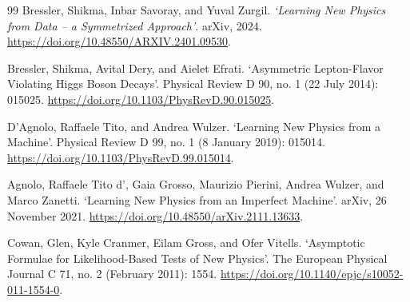
\begin{thebibliography}{99}
    Bressler, Shikma, Inbar Savoray, and Yuval Zurgil.
    \textit{‘Learning New Physics from Data -- a Symmetrized Approach’}. arXiv, 2024. \url{https://doi.org/10.48550/ARXIV.2401.09530}.

    Bressler, Shikma, Avital Dery, and Aielet Efrati. ‘Asymmetric Lepton-Flavor Violating Higgs Boson Decays’. Physical Review D 90, no. 1 (22 July 2014): 015025. \url{https://doi.org/10.1103/PhysRevD.90.015025}.

    D’Agnolo, Raffaele Tito, and Andrea Wulzer. ‘Learning New Physics from a Machine’. Physical Review D 99, no. 1 (8 January 2019): 015014. \url{https://doi.org/10.1103/PhysRevD.99.015014}.

    Agnolo, Raffaele Tito d’, Gaia Grosso, Maurizio Pierini, Andrea Wulzer, and Marco Zanetti. ‘Learning New Physics from an Imperfect Machine’. arXiv, 26 November 2021. \url{https://doi.org/10.48550/arXiv.2111.13633}.

    Cowan, Glen, Kyle Cranmer, Eilam Gross, and Ofer Vitells. ‘Asymptotic Formulae for Likelihood-Based Tests of New Physics’. The European Physical Journal C 71, no. 2 (February 2011): 1554. \url{https://doi.org/10.1140/epjc/s10052-011-1554-0}.
\end{thebibliography}